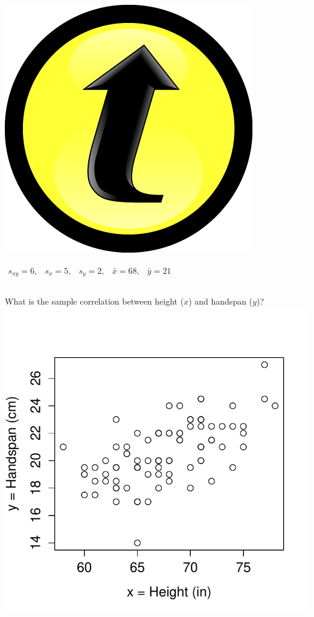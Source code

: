 \documentclass[handout]{beamer}
\begin{document}
\begin{frame}
\frametitle{\includegraphics[scale = 0.05]{./images/clicker}}

$\begin{array}{ccccc} s_{xy} = 6,&s_x = 5,& s_y = 2,& \bar{x} = 68,& \bar{y} = 21\end{array}$
\begin{columns}[c]
\column{2.5in}
What is the sample correlation between height ($x$) and handspan ($y$)?
\column{1.8in}
\includegraphics[scale = 0.4]{./images/height_handspan1}
\end{columns}
\alert{$$\phantom{r = \frac{s_{xy}}{s_x s_y} = \frac{6}{4.5\times 2.2} \approx 0.6}$$}
\end{frame}
\end{document}
